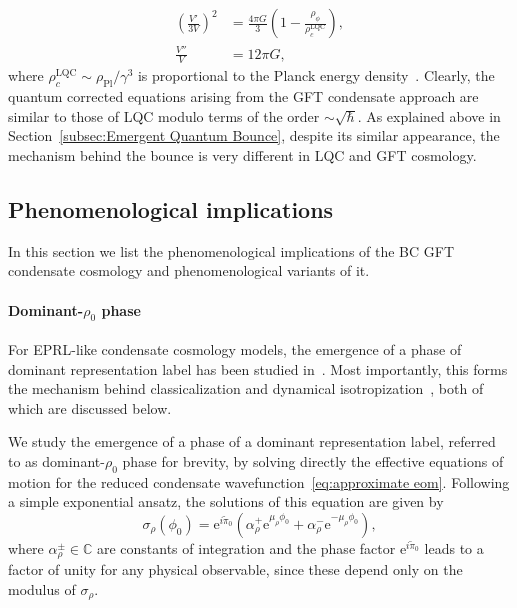 \documentclass[11pt,a4paper]{article}
\newcommand{\C}{\mathbb C}
\newcommand{\e}{\textrm{e}}
\begin{document}
%
\begin{align}
\left(\frac{V'}{3V}\right)^2    &= \frac{4\pi G}{3}\left(1-\frac{\rho_{\phi}}{\rho_c^{\text{LQC}}}\right),\label{eq:LQC Friedmann 1}\\[7pt]
\frac{V''}{V}                   &= 12\pi G,\label{eq:LQC Friedmann 2}
\end{align}
%
where $\rho_c^{\text{LQC}} \sim \rho_{\text{Pl}}/\gamma^3$ is proportional to the Planck energy density~\cite{Ashtekar:2006wn}. Clearly, the quantum corrected equations arising from the GFT condensate approach are similar to those of LQC modulo terms of the order $\sim\sqrt{\hbar}$. As explained above in Section~\ref{subsec:Emergent Quantum Bounce}, despite its similar appearance, the mechanism behind the bounce is very different in LQC and GFT     cosmology.

\subsection{Phenomenological implications}\label{subsec:Phenomenological Implications}

In this section we list the phenomenological implications of the BC GFT condensate cosmology and phenomenological variants of it. 

\paragraph{Dominant-$\rho_0$ phase} 

For EPRL-like condensate cosmology models, the emergence of a phase of dominant representation label has been studied in~\cite{deCesare:2017ynn,Gielen:2016uft,Pithis:2016cxg}. Most importantly, this forms the mechanism behind classicalization and dynamical isotropization~\cite{Pithis:2016cxg}, both of which are discussed below. 

We study the emergence of a phase of a dominant representation label, referred to as dominant-$\rho_0$ phase for brevity, by solving directly the effective equations of motion for the reduced condensate wavefunction~\eqref{eq:approximate eom}. Following a simple exponential ansatz, the solutions of this equation are given by
%
\begin{equation}
\sigma_{\rho}(\phi_0)
=
\e^{i\tilde{\pi}_0}\left(\alpha_{\rho}^+ \e^{\mu_{\rho}\phi_0} + \alpha_{\rho}^- \e^{-\mu_{\rho}\phi_0}\right),
\end{equation}
%
where $\alpha_{\rho}^{\pm}\in\C$ are constants of integration and the phase factor $\e^{i\tilde{\pi}_0}$ leads to a factor of unity for any physical observable, since these depend only on the modulus of $\sigma_{\rho}$.
\end{document}
